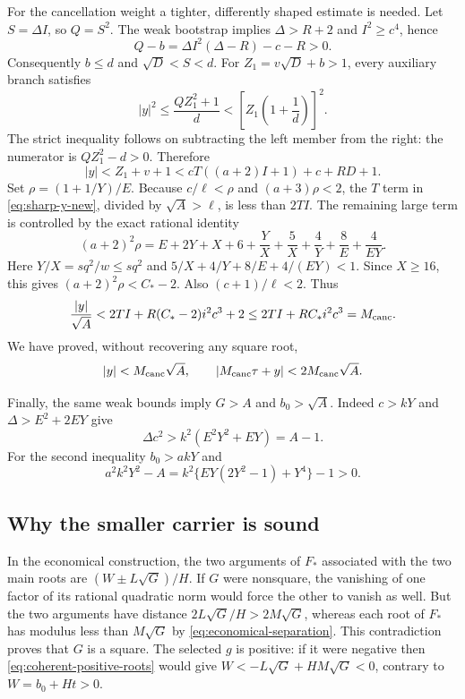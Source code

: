 For the cancellation weight a tighter, differently shaped estimate is
needed.  Let $S=\Delta I$, so $Q=S^2$.  The weak bootstrap implies
$\Delta>R+2$ and $I^2\ge c^4$, hence
\[
 Q-b=\Delta I^2(\Delta-R)-c-R>0.
\]
Consequently $b\le d$ and $\sqrt D<S<d$.  For
$Z_1=v\sqrt D+b>1$, every auxiliary branch satisfies
\[
 |y|^2\le\frac{QZ_1^2+1}{d}
 <\left[Z_1\left(1+\frac1d\right)\right]^2.
\]
The strict inequality follows on subtracting the left member from the
right: the numerator is $QZ_1^2-d>0$.  Therefore
\begin{equation}
 |y|<Z_1+v+1<cT((a+2)I+1)+c+RD+1.
 \label{eq:sharp-y-new}
\end{equation}
Set $\rho=(1+1/Y)/E$.  Because $c/\ell<\rho$ and
$(a+3)\rho<2$, the $T$ term in \eqref{eq:sharp-y-new}, divided by
$\sqrt A>\ell$, is less than $2TI$.  The remaining large term is
controlled by the exact rational identity
\[
 (a+2)^2\rho
 =E+2Y+X+6+\frac YX+\frac5X+\frac4Y+\frac8E+\frac4{EY}.
\]
Here $Y/X=sq^2/w\le sq^2$ and
$5/X+4/Y+8/E+4/(EY)<1$.  Since $X\ge16$, this gives
$(a+2)^2\rho<C_*-2$.  Also $(c+1)/\ell<2$.  Thus
\[
 \frac{|y|}{\sqrt A}
 <2TI+R(C_*-2)i^2c^3+2
 \le 2TI+RC_*i^2c^3=M_{\rm canc}.
\]
We have proved, without recovering any square root,
\begin{equation}
 |y|<M_{\rm canc}\sqrt A,
 \qquad |M_{\rm canc}\tau+y|<2M_{\rm canc}\sqrt A.
 \label{eq:cancellation-separation}
\end{equation}

Finally, the same weak bounds imply $G>A$ and $b_0>\sqrt A$.  Indeed
$c>kY$ and $\Delta>E^2+2EY$ give
\[
 \Delta c^2>k^2(E^2Y^2+EY)=A-1.
\]
For the second inequality $b_0>akY$ and
\[
 a^2k^2Y^2-A=k^2\{EY(2Y^2-1)+Y^4\}-1>0.
\]

\subsection{Why the smaller carrier is sound}

In the economical construction, the two arguments of $F_*$ associated
with the two main roots are $(W\pm L\sqrt G)/H$.  If $G$ were nonsquare,
the vanishing of one factor of its rational quadratic norm would force
the other to vanish as well.  But the two arguments have distance
$2L\sqrt G/H>2M\sqrt G$, whereas each root of $F_*$ has modulus less
than $M\sqrt G$ by \eqref{eq:economical-separation}.  This contradiction
proves that $G$ is a square.  The selected $g$ is positive: if it were
negative then \eqref{eq:coherent-positive-roots} would give
$W<-L\sqrt G+HM\sqrt G<0$, contrary to $W=b_0+Ht>0$.

